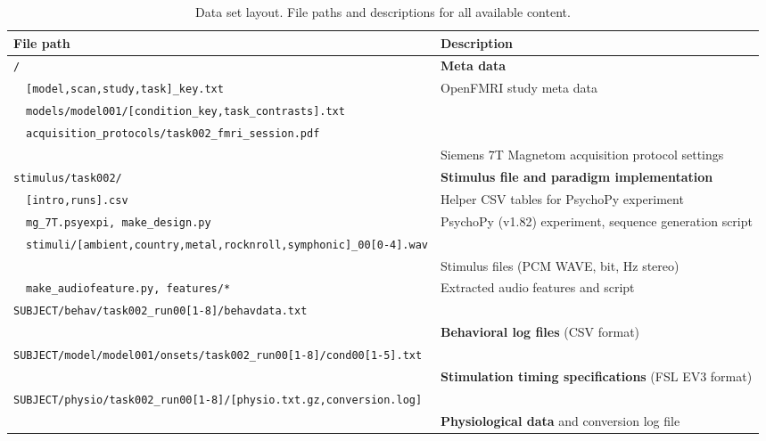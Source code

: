 \documentclass[10pt,a4paper,twocolumn]{article}
\begin{document}
\begin{table}[p]
  \centering
  \caption{Data set layout. File paths and descriptions for all available content.}
  \begin{tabular}{p{2mm}p{65mm}p{95mm}}
    \toprule
    \multicolumn{2}{l}{\textbf{File path}} & \textbf{Description} \\
    \toprule
    \multicolumn{2}{l}{\texttt{/}} & \textbf{Meta data} \\
    & \texttt{[model,scan,study,task]\_key.txt} & OpenFMRI study meta data \\
    & \texttt{models/model001/[condition\_key,task\_contrasts].txt} & \\
    & \texttt{acquisition\_protocols/task002\_fmri\_session.pdf} \\
    & & Siemens 7T Magnetom acquisition protocol settings\\
    \midrule
    \multicolumn{2}{l}{\texttt{stimulus/task002/}} & \textbf{Stimulus file and paradigm implementation}\\
    & \texttt{[intro,runs].csv} & Helper CSV tables for PsychoPy experiment \\
    & \texttt{mg\_7T.psyexpi, make\_design.py} & PsychoPy (v1.82) experiment, sequence generation script \\
    & \texttt{stimuli/[ambient,country,metal,rocknroll,symphonic]\_00[0-4].wav} \\
    & & Stimulus files (PCM WAVE, \unit[16]{bit}, \unit[44100]{Hz} stereo)\\
    & \texttt{make\_audiofeature.py, features/*} & Extracted audio features and script \\

    \midrule
    \multicolumn{3}{l}{\texttt{SUBJECT/behav/task002\_run00[1-8]/behavdata.txt}} \\
    & & \textbf{Behavioral log files} (CSV format) \\
    \multicolumn{3}{l}{\texttt{SUBJECT/model/model001/onsets/task002\_run00[1-8]/cond00[1-5].txt}} \\
    & & \textbf{Stimulation timing specifications} (FSL EV3 format)\\

    \midrule
    \multicolumn{3}{l}{\texttt{SUBJECT/physio/task002\_run00[1-8]/[physio.txt.gz,conversion.log]}} \\
    & & \textbf{Physiological data} and conversion log file \\


\end{tabular}
\end{table}
\end{document}
